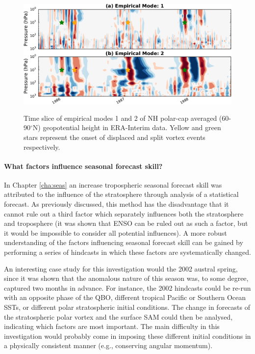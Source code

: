 \begin{figure}[t]
  \centering
  \noindent\includegraphics[width=\textwidth,angle=0]{figures/chapter-conclusions/EMD2.pdf}\\
  \caption[EMD timeseries]{Time slice of empirical modes 1 and 2 of NH polar-cap
    averaged (60-90$^{\circ}$N) geopotential height in ERA-Interim data. Yellow
    and green stars represent the onset of displaced and split vortex events
    respectively.}\label{fig:emd}
\end{figure}


\paragraph{What factors influence seasonal forecast skill?} In Chapter
\ref{cha:seas} an increase tropospheric seasonal forecast skill was attributed
to the influence of the stratosphere through analysis of a statistical
forecast. As previously discussed, this method has the disadvantage that it
cannot rule out a third factor which separately influences both the stratosphere
and troposphere (it was shown that ENSO can be ruled out as such a factor, but
it would be impossible to consider all potential influences). A more robust
understanding of the factors influencing seasonal forecast skill can be gained
by performing a series of hindcasts in which these factors are systematically
changed.

An interesting case study for this investigation would the 2002 austral spring,
since it was shown that the anomalous nature of this season was, to some degree,
captured two months in advance. For instance, the 2002 hindcasts could be re-run
with an opposite phase of the QBO, different tropical Pacific or Southern Ocean
SSTs, or different polar stratospheric initial conditions. The change in
forecasts of the stratospheric polar vortex and the surface SAM could then be
analysed, indicating which factors are most important. The main difficulty in
this investigation would probably come in imposing these different initial
conditions in a physically consistent manner (e.g., conserving angular
momentum).

